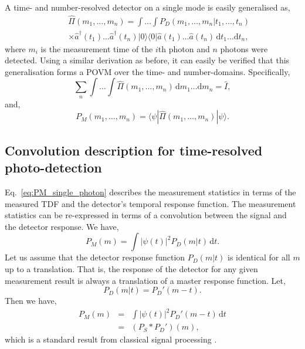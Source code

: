 \documentclass[aps,pra,twocolumn,amsmath,amssymb,color,superscriptaddress]{revtex4}
\newcommand{\bra}[1]{\langle#1|}
\newcommand{\ket}[1]{|#1\rangle}
\begin{document}
A time- and number-resolved detector on a single mode is easily generalised as,
\begin{eqnarray}
&&\hat\Pi(m_1,\dots,m_n) = \int \!\! \dots \!\! \int P_D(m_1,\dots,m_n|t_1,\dots,t_n) \nonumber\\
&&\times \hat{a}^\dag(t_1) \dots \hat{a}^\dag(t_n) \ket{0}\bra{0} \hat{a}(t_1) \dots \hat{a}(t_n)\, \mathrm{d}t_1 \dots \mathrm{d}t_n,
\end{eqnarray}
where $m_i$ is the measurement time of the $i$th photon and $n$ photons were detected. Using a similar derivation as before, it can easily be verified that this generalisation forms a POVM over the time- and number-domains. Specifically,
\begin{equation}
\sum_n \int \!\! \dots \!\! \int \hat\Pi(m_1,\dots,m_n) \, \mathrm{d}m_1\dots\mathrm{d}m_n = \hat{I},
\end{equation}
and,
\begin{equation}
P_M(m_1,\dots,m_n) = \bra{\psi} \hat\Pi(m_1,\dots,m_n) \ket{\psi}.
\end{equation}

%
%

\subsection{Convolution description for time-resolved photo-detection}

Eq.~\ref{eq:PM_single_photon} describes the measurement statistics in terms of the measured TDF and the detector's temporal response function. The measurement statistics can be re-expressed in terms of a convolution between the signal and the detector response. We have,
\begin{equation}
P_M(m) = \int |\psi(t)|^2 P_D(m|t)\,\mathrm{d}t.
\end{equation}
Let us assume that the detector response function $P_D(m|t)$ is identical for all $m$ up to a translation. That is, the response of the detector for any given measurement result is always a translation of a master response function. Let,
\begin{equation}
P_D(m|t) = P_D'(m-t).
\end{equation}
Then we have,
\begin{eqnarray}
P_M(m) &=& \int |\psi(t)|^2 P_D'(m-t)\,\mathrm{d}t \nonumber \\
&=& (P_S \ast P_D')(m),
\end{eqnarray}
which is a standard result from classical signal processing \cite{bib:OppenheimSchafer}.
\end{document}
